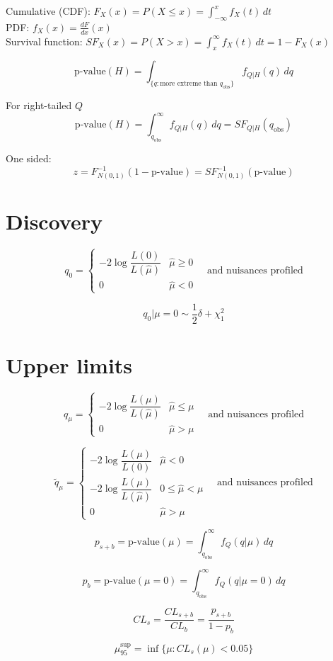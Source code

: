 \documentclass{article}
\begin{document}
Cumulative (CDF): $F_X(x) = P(X\leq x) = \int_{-\infty}^x f_X(t)\,dt$\\
PDF: $f_X(x) = \frac{dF}{dx}(x)$ \\
Survival function: $SF_X(x) = P(X>x) = \int_x^\infty f_X(t)\, dt = 1 - F_X(x)$


\[
  \text{p-value}(H) = \int_{\{q:\text{more extreme than } q_\text{obs}\}} f_{Q|H}(q)\,dq
\]

For right-tailed $Q$
\[
  \text{p-value}(H) = \int_{q_\text{obs}}^{\infty} f_{Q|H}(q)\, dq = SF_{Q|H}(q_\text{obs})
\]

One sided:
\[
z = F^{-1}_{N(0,1)}(1 - \text{p-value}) = SF^{-1}_{N(0,1)}(\text{p-value})
\]

\section{Discovery}

\begin{equation*}
q_0 = \begin{cases}
  -2\log \dfrac{L(0)}{L(\hat{\mu})} & \hat{\mu} \geq 0 \\
  0 & \hat{\mu} < 0
  \end{cases}\quad\text{and nuisances profiled}
\end{equation*}

\[
q_0|\mu=0 \sim \frac{1}{2}\delta + \chi^2_1
\]

\section{Upper limits}

\begin{equation*}
q_\mu = \begin{cases}
  -2\log \dfrac{L(\mu)}{L(\hat{\mu})} & \hat\mu \leq \mu \\
  0 & \hat\mu > \mu
  \end{cases}\quad\text{and nuisances profiled}
\end{equation*}


\begin{equation*}
\tilde{q}_\mu = \begin{cases}
  -2\log \dfrac{L(\mu)}{L(0)} & \hat{\mu} < 0 \\
  -2\log \dfrac{L(\mu)}{L(\hat{\mu})} & 0\leq \hat\mu < \mu \\
  0 & \hat\mu > \mu
  \end{cases}\quad\text{and nuisances profiled}
\end{equation*}


\[
p_{s+b} = \text{p-value}(\mu) = \int_{q_\text{obs}}^\infty f_Q(q | \mu)\,dq
\]

\[
p_b = \text{p-value}(\mu=0) = \int_{q_\text{obs}}^\infty f_Q(q | \mu=0)\,dq
\]

\[
CL_s = \frac{CL_{s+b}}{CL_{b}} = \frac{p_{s+b}}{1 - p_b}
\]

\[
\mu_{95}^\text{sup} = \inf\{\mu:CL_s(\mu) < 0.05\}
\]
\end{document}
